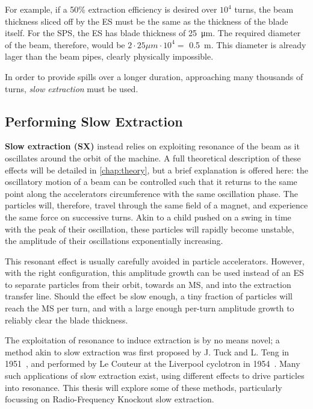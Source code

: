 \documentclass[11pt]{report}
\begin{document}
For example, if a 50\% extraction efficiency is desired over $10^4$ turns, the beam thickness sliced off by the ES must be the same as the thickness of the blade itself. For the SPS, the ES has blade thickness of \qty{25}{\micro\meter}. The required diameter of the beam, therefore, would be $2\cdot 25\mu m\cdot 10^4 = $ \qty{0.5}{\meter}. This diameter is already lager than the beam pipes, clearly physically impossible.

In order to provide spills over a longer duration, approaching many thousands of turns, \textit{slow extraction} must be used. 

\subsection{Performing Slow Extraction}

\textbf{Slow extraction (SX)} instead relies on exploiting resonance of the beam as it oscillates around the orbit of the machine. A full theoretical description of these effects will be detailed in \autoref{chap:theory}, but a brief explanation is offered here: the oscillatory motion of a beam can be controlled such that it returns to the same point along the accelerators circumference with the same oscillation phase. The particles will, therefore, travel through the same field of a magnet, and experience the same force on successive turns. Akin to a child pushed on a swing in time with the peak of their oscillation, these particles will rapidly become unstable, the amplitude of their oscillations exponentially increasing. 

This resonant effect is usually carefully avoided in particle accelerators. However, with the right configuration, this amplitude growth can be used instead of an ES to separate particles from their orbit, towards an MS, and into the extraction transfer line. Should the effect be slow enough, a tiny fraction of particles will reach the MS per turn, and with a large enough per-turn amplitude growth to reliably clear the blade thickness.

The exploitation of resonance to induce extraction is by no means novel; a method akin to slow extraction was first proposed by J. Tuck and L. Teng in 1951~\cite{Couteur_1951}, and performed by Le Couteur at the Liverpool cyclotron in 1954~\cite{Couteur_1955}. Many such applications of slow extraction exist, using different effects to drive particles into resonance. This thesis will explore some of these methods, particularly focussing on Radio-Frequency Knockout slow extraction.
\end{document}
